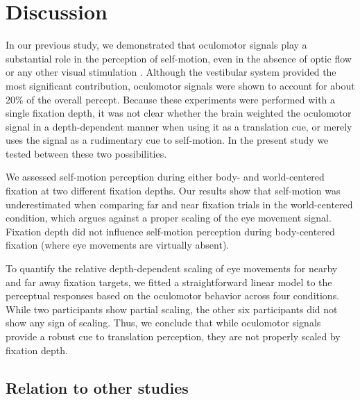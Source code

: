 \section{Discussion}

In our previous study, we demonstrated that oculomotor signals play a substantial role in the perception of self-motion, even in the absence of optic flow or any other visual stimulation \cite{clemens2015a}. Although the vestibular system provided the most significant contribution, oculomotor signals were shown to account for about 20\% of the overall percept. Because these experiments were performed with a single fixation depth, it was not clear whether the brain weighted the oculomotor signal in a depth-dependent manner when using it as a translation cue, or merely uses the signal as a rudimentary cue to self-motion. In the present study we tested between these two possibilities.

We assessed self-motion perception during either body- and world-centered fixation at two different fixation depths. Our results show that self-motion was underestimated when comparing far and near fixation trials in the world-centered condition, which argues against a proper scaling of the eye movement signal. Fixation depth did not influence self-motion perception during body-centered fixation (where eye movements are virtually absent).

To quantify the relative depth-dependent scaling of eye movements for nearby and far away fixation targets, we fitted a straightforward linear model to the perceptual responses based on the oculomotor behavior across four conditions. While two participants show partial scaling, the other six participants did not show any sign of scaling. Thus, we conclude that while oculomotor signals provide a robust cue to translation perception, they are not properly scaled by fixation depth.


\subsection{Relation to other studies}

